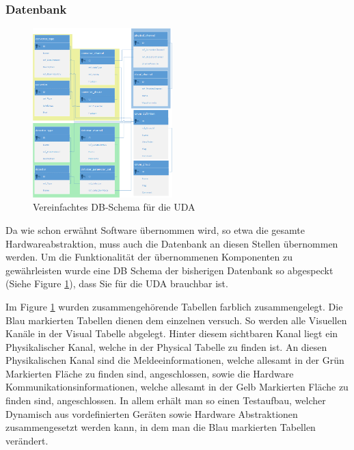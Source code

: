 \documentclass[10pt]{scrartcl}
\begin{document}
\subsubsection{Datenbank}
\begin{figure}
	\begin{center}
		\includegraphics[width=0.48\textwidth]{DBShemaEasy2.png}
		\caption{Vereinfachtes DB-Schema für die UDA}
		\label{fig:DBSchemaUDA}
	\end{center}
\end{figure}

Da wie schon erwähnt Software übernommen wird, so etwa die gesamte Hardwareabstraktion, muss auch die Datenbank an diesen Stellen übernommen werden. Um die Funktionalität der übernommenen Komponenten zu gewährleisten wurde eine DB Schema der bisherigen Datenbank so abgespeckt (Siehe Figure \ref{fig:DBSchemaUDA}), dass Sie für die UDA brauchbar ist.


Im Figure \ref{fig:DBSchemaUDA} wurden zusammengehörende Tabellen farblich zusammengelegt. Die Blau markierten Tabellen dienen dem einzelnen versuch. So werden alle Visuellen Kanäle in der Visual Tabelle abgelegt. Hinter diesem sichtbaren Kanal liegt ein Physikalischer Kanal, welche in der Physical Tabelle zu finden ist. An diesen Physikalischen Kanal sind die Meldeeinformationen, welche allesamt in der Grün Markierten Fläche zu finden sind, angeschlossen, sowie die Hardware Kommunikationsinformationen, welche allesamt in der Gelb Markierten Fläche zu finden sind, angeschlossen. In allem erhält man so einen Testaufbau, welcher Dynamisch aus vordefinierten Geräten sowie Hardware Abstraktionen zusammengesetzt werden kann, in dem man die Blau markierten Tabellen verändert.
\end{document}
